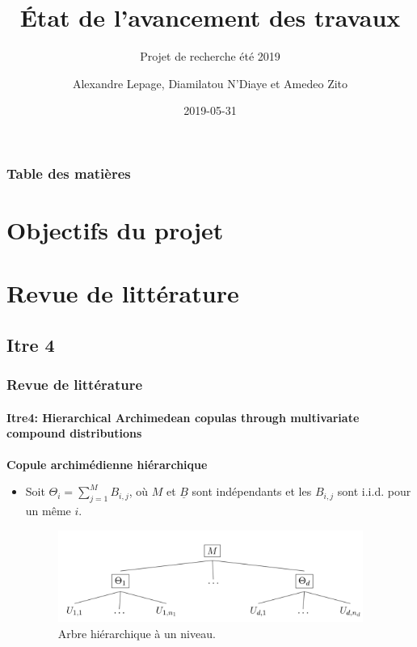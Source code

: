 \documentclass[11pt]{beamer}
\title[]{État de l'avancement des travaux}
\subtitle[]{Projet de recherche été 2019}
\author[Lepage A., N'Diaye D. et Zito A.]{Alexandre Lepage, Diamilatou N'Diaye \newline et Amedeo Zito}
\institute[ULaval] %
{
  École d'actuariat \\
  Université Laval, Québec, Canada \\
}
\date{2019-05-31} %
\begin{document}
\begin{frame}[label=titre, plain]
\titlepage
\end{frame}


\begin{frame}[allowframebreaks]
	\frametitle{Table des matières}
	\tableofcontents
\end{frame}


\section{Objectifs du projet}


\section{Revue de littérature}
\subsection{Itre 4}
\begin{frame}
	\frametitle{Revue de littérature}
	\framesubtitle{Itre4: Hierarchical Archimedean copulas through multivariate compound
		distributions \cite{Itre4}}
	
	\textbf{Copule archimédienne hiérarchique}
	
	\begin{itemize}
		\item Soit $\Theta_i = \sum_{j=1}^{M} B_{i,j}$, où $M$ et $\underline{B}$ sont indépendants et les $B_{i,j}$ sont i.i.d. pour un même $i$.
		\begin{figure}[H]
			\centering
			\includegraphics[height=3cm]{Hierarchie_1}
			\renewcommand{\figurename}{Illustration}
			\caption{Arbre hiérarchique à un niveau.}\label{hierarchie}
		\end{figure}
	
	\end{itemize}
\end{frame}
\end{document}
